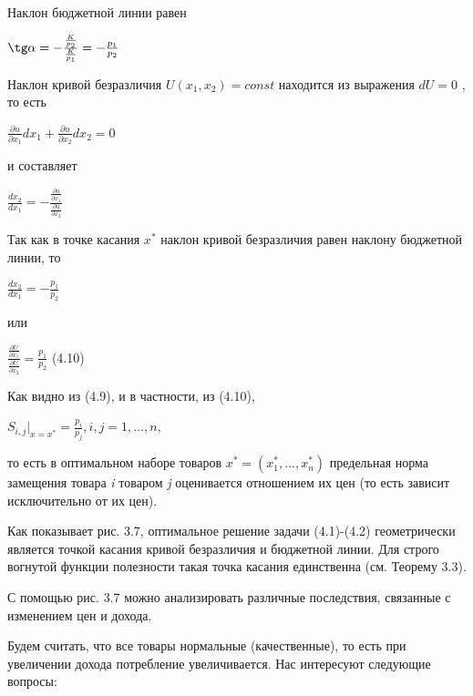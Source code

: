 \documentclass[12pt, 4paper]{book}
\begin{document}
{Наклон бюджетной линии равен 
\begin{center}
$\tg \alpha = - \frac{\frac{K}{p_2}}{\frac{K}{p_1}}=-\frac{p_1}{p_2}$
\end{center}
\par

Наклон кривой безразличия $U (x_1,x_2)= const$ находится из выражения $dU=0$ , то есть
\begin{center}
$\frac{\partial u}{\partial x_1}dx_1 + \frac{\partial u}{\partial x_2}d x_2=0$
\end{center}
\par

и составляет
\begin{center}
$\frac{dx_2}{dx_1}= - \frac{\frac{\partial u}{\partial x_1}}{\frac{\partial u}{\partial x_2}}$
\end{center}
\par

Так как в точке касания $x^{*}$ наклон кривой безразличия равен наклону бюджетной линии, то 
\begin{center}
$\frac{d x_2}{d x_1}= -\frac{p_1}{p_2}$
\end{center}
или 
\begin{center}
$\frac{\frac{\partial U}{\partial x_1}}{\frac{\partial U}{\partial x_2}}=\frac{p_1}{p_2}$ (4.10)
\end{center}
\par

Как видно из (4.9), и в частности, из (4.10),
\begin{center}
$S_{i,j}|_{x=x^{*}}=\frac{p_i}{p_j}, i,j = 1,...,n,$
\end{center}
\par

то есть в оптимальном наборе товаров $x^{*}=(x_{1}^{*},...,x_{n}^{*})$ предельная норма замещения товара \textit{i} товаром \textit{j} оценивается отношением их цен (то есть зависит исключительно от их цен). 
\par

Как показывает рис. 3.7, оптимальное решение задачи (4.1)-(4.2) геометрически является точкой касания кривой безразличия и бюджетной линии. Для строго вогнутой функции полезности такая точка касания единственна (см. Теорему 3.3).
\par

С помощью рис. 3.7 можно анализировать различные последствия, связанные с изменением цен и дохода.
\par

Будем считать, что все товары нормальные (качественные), то есть при увеличении дохода потребление увеличивается. Нас интересуют следующие вопросы: 
\par

}
\end{document}
